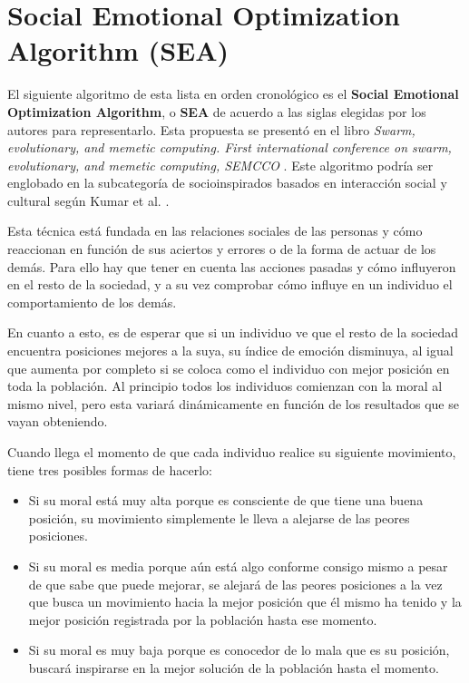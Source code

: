 \section{Social Emotional Optimization Algorithm (SEA)}

El siguiente algoritmo de esta lista en orden cronológico es el \textbf{Social Emotional Optimization Algorithm}, o \textbf{SEA} de acuerdo a las siglas elegidas por los autores \cite{sea-chapter} para representarlo. Esta propuesta se presentó en el libro \textit{Swarm, evolutionary, and memetic computing. First international conference on swarm, evolutionary, and memetic computing, SEMCCO} \cite{sea-book}. Este algoritmo podría ser englobado en la subcategoría de socioinspirados basados en interacción social y cultural según Kumar et al. \cite{socio-evolution-algorithm}.

Esta técnica está fundada en las relaciones sociales de las personas y cómo reaccionan en función de sus aciertos y errores o de la forma de actuar de los demás. Para ello hay que tener en cuenta las acciones pasadas y cómo influyeron en el resto de la sociedad, y a su vez comprobar cómo influye en un individuo el comportamiento de los demás.

En cuanto a esto, es de esperar que si un individuo ve que el resto de la sociedad encuentra posiciones mejores a la suya, su índice de emoción disminuya, al igual que aumenta por completo si se coloca como el individuo con mejor posición en toda la población. Al principio todos los individuos comienzan con la moral al mismo nivel, pero esta variará dinámicamente en función de los resultados que se vayan obteniendo.

Cuando llega el momento de que cada individuo realice su siguiente movimiento, tiene tres posibles formas de hacerlo:

\begin{itemize}
	\item Si su moral está muy alta porque es consciente de que tiene una buena posición, su movimiento simplemente le lleva a alejarse de las peores posiciones.
	\item Si su moral es media porque aún está algo conforme consigo mismo a pesar de que sabe que puede mejorar, se alejará de las peores posiciones a la vez que busca un movimiento hacia la mejor posición que él mismo ha tenido y la mejor posición registrada por la población hasta ese momento.
	\item Si su moral es muy baja porque es conocedor de lo mala que es su posición, buscará inspirarse en la mejor solución de la población hasta el momento.
\end{itemize}

